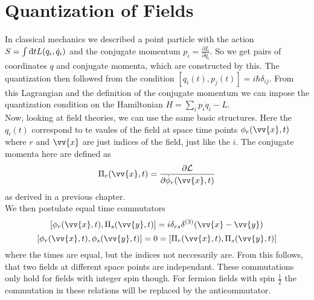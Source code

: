 \documentclass{include/thesisclass}
\newcommand{\LL}{\mathcal{L}}
\newcommand{\vx}{\vv{x}}
\newcommand{\vy}{\vv{y}}
\newcommand{\dd}{{\rm d}}
\newcommand{\p}{\partial}
\begin{document}
    \FrontMatter

    
    
    \begingroup \let\clearpage\relax    %
    \tableofcontents                    %
    \endgroup



    \MainMatter







\chapter{Quantization of Fields}

In classical mechanics we described a point particle with the action $S = \int \dd t L(q_i, \dot{q}_i)$ and the conjugate momentum $p_i = \frac{\p L}{\p \dot{q}_i}$. So we get pairs of coordinates $q$ and conjugate momenta, which are constructed by this. The quantization then followed from the condition $[q_i(t), p_j(t)] = i \hbar \delta_{ij}$. From this Lagrangian and the definition of the conjugate momentum we can impose the quantization condition on the Hamiltonian $H = \sum_i p_i \dot{q}_i - L$.\\
Now, looking at field theories, we can use the same basic structures. Here the $q_i(t)$ correspond to te vaules of the field at space time points $\phi_r(\vx,t)$ where $r$ and $\vx$ are just indices of the field, just like the $i$. The conjugate momenta here are defined as 
\[ \Pi_r(\vx, t) = \frac{\p \LL}{\p \dot{\phi}_r(\vx,t)}\]
as derived in a previous chapter.\\
We then postulate equal time commutators
\[ [\phi_r(\vx, t) , \Pi_s(\vy, t) ] = i \delta_{rs} \delta^{(3)}(\vx - \vy)\]
\[ [ \phi_r(\vx, t) , \phi_s( \vy, t) ] = 0 = [ \Pi_r(\vx, t), \Pi_s(\vy,t)]\]
where the times are equal, but the indices not neccesarily are. From this follows, that two fields at different space points are independant. These commutations only hold for fields with integer spin though. For fermion fields with spin $\frac{1}{2}$ the commutation in these relations will be replaced by the anticommutator.
\end{document}
